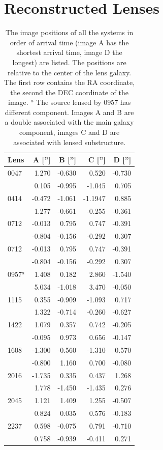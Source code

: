 \documentclass[useAMS,usenatbib]{mn2e}
\begin{document}
\section{Reconstructed Lenses}\label{sec:reconstructions}
\begin{table}
  \begin{center}
    \begin{tabular}{l r r r r}
      Lens & A [''] & B [''] & C [''] & D [''] \\ \hline
      0047 & 1.270 & -0.630 & 0.520 & -0.730 \\
           & 0.105 & -0.995 & -1.045 & 0.705 \\
      0414 & -0.472 & -1.061 & -1.1947 & 0.885 \\
           & 1.277 & -0.661 & -0.255 & -0.361 \\
      0712 & -0.013 & 0.795 & 0.747 & -0.391 \\
           & -0.804 & -0.156 & -0.292 & 0.307 \\
      0712 & -0.013 & 0.795 & 0.747 & -0.391 \\
           & -0.804 & -0.156 & -0.292 & 0.307 \\
      0957$^{a}$ & 1.408 & 0.182 & 2.860 & -1.540 \\
           & 5.034 & -1.018 & 3.470 & -0.050 \\
      1115 & 0.355 & -0.909 & -1.093 & 0.717 \\
           & 1.322 & -0.714 & -0.260 & -0.627 \\
      1422 & 1.079 & 0.357 & 0.742 & -0.205 \\
           & -0.095 & 0.973 & 0.656 & -0.147 \\
      1608 & -1.300 & -0.560 & -1.310 & 0.570 \\
           & -0.800 & 1.160 & 0.700 & -0.080 \\
      2016 & -1.735 & 0.335 & 0.437 & 1.268 \\
           & 1.778 & -1.450 & -1.435 & 0.276 \\
      2045 & 1.121 & 1.409 & 1.255 & -0.507 \\
           & 0.824 & 0.035 & 0.576 & -0.183 \\
      2237 & 0.598 & -0.075 & 0.791 & -0.710 \\
           & 0.758 & -0.939 & -0.411 & 0.271 \\
    \end{tabular}
    \caption[width=\linewidth]{The image positions of all the systems in order of arrival time (image A has the shortest arrival time, image D the longest) are listed. The positions are relative to the center of the lens galaxy. The first row contains the RA coordinate, the second the DEC coordinate of the image. \newline $^{a}$ The source lensed by 0957 has different component. Images A and B are a double associated with the main galaxy component, images C and D are associated with lensed substructure.}
    \label{tab:lenspositions}
  \end{center}
\end{table}
\end{document}
